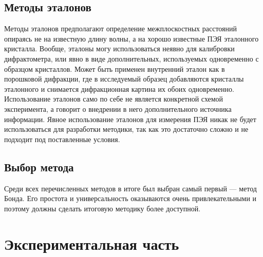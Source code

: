 \documentclass[a4paper,14pt]{extarticle}
\begin{document}
\subsection{Методы эталонов}

Методы эталонов предполагают определение межплоскостных расстояний опираясь не на известную длину волны, а на хорошо известные ПЭЯ эталонного кристалла.
Вообще, эталоны могу использоваться неявно для калибровки дифрактометра, или явно в виде дополнительных, используемых одновременно с образцом кристаллов.
Может быть применен внутренний эталон как в порошковой дифракции, где в исследуемый образец добавляются кристаллы эталонного и снимается дифракционная картина их обоих одновременно.
Использование эталонов само по себе не является конкретной схемой эксперимента, а говорит о внедрении в него дополнительного источника информации.
Явное использование эталонов для измерения ПЭЯ никак не будет использоваться для разработки методики, так как это достаточно сложно и не подходит под поставленные условия.

\subsection{Выбор метода}

Среди всех перечисленных методов в итоге был выбран самый первый --- метод Бонда.
Его простота и универсальность оказываются очень привлекательными и поэтому должны сделать итоговую методику более доступной.

\section{Экспериментальная часть}
\end{document}
